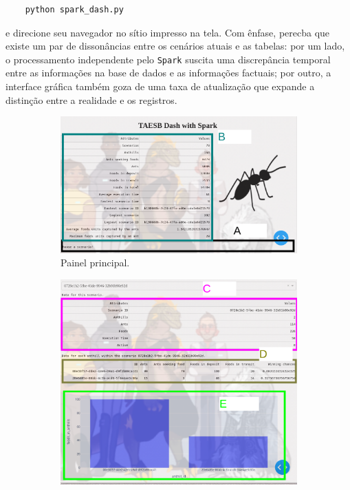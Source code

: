 \documentclass[12pt,oneside,a4paper]{article}
\begin{document}
\begin{lstlisting} 
	python spark_dash.py    
\end{lstlisting} 

\noindent e direcione seu navegador no sítio impresso na tela. Com ênfase, perecba que existe um par de dissonâncias entre os cenários atuais e as tabelas: por um lado, o processamento independente pelo \texttt{Spark} suscita uma discrepância temporal entre as informações na base de dados e as informações factuais; por outro, a interface gráfica também goza de uma taxa de atualização que expande a distinção entre a realidade e os registros.  

\begin{figure} 
	\centering 
	\begin{subfigure}{.49\textwidth} 
		\centering 
		\includegraphics[width=\textwidth]{../images/panel_paint.png} 
		\caption{Painel principal.} 
	\end{subfigure} 
	\begin{subfigure}{.49\textwidth}  
		\centering    
		\includegraphics[width=\textwidth]{../images/scenarios_paint.png} 

\end{subfigure}
\end{figure}
\end{document}
